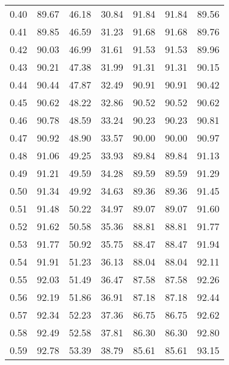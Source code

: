 \begin{tabular}{|c|c|c|c|c|c|c|}
      0.40 &     89.67 &     46.18 &      30.84 &   91.84 &      91.84 &         89.56 \\
      0.41 &     89.85 &     46.59 &      31.23 &   91.68 &      91.68 &         89.76 \\
      0.42 &     90.03 &     46.99 &      31.61 &   91.53 &      91.53 &         89.96 \\
      0.43 &     90.21 &     47.38 &      31.99 &   91.31 &      91.31 &         90.15 \\
      0.44 &     90.44 &     47.87 &      32.49 &   90.91 &      90.91 &         90.42 \\
      0.45 &     90.62 &     48.22 &      32.86 &   90.52 &      90.52 &         90.62 \\
      0.46 &     90.78 &     48.59 &      33.24 &   90.23 &      90.23 &         90.81 \\
      0.47 &     90.92 &     48.90 &      33.57 &   90.00 &      90.00 &         90.97 \\
      0.48 &     91.06 &     49.25 &      33.93 &   89.84 &      89.84 &         91.13 \\
      0.49 &     91.21 &     49.59 &      34.28 &   89.59 &      89.59 &         91.29 \\
      0.50 &     91.34 &     49.92 &      34.63 &   89.36 &      89.36 &         91.45 \\
      0.51 &     91.48 &     50.22 &      34.97 &   89.07 &      89.07 &         91.60 \\
      0.52 &     91.62 &     50.58 &      35.36 &   88.81 &      88.81 &         91.77 \\
      0.53 &     91.77 &     50.92 &      35.75 &   88.47 &      88.47 &         91.94 \\
      0.54 &     91.91 &     51.23 &      36.13 &   88.04 &      88.04 &         92.11 \\
      0.55 &     92.03 &     51.49 &      36.47 &   87.58 &      87.58 &         92.26 \\
      0.56 &     92.19 &     51.86 &      36.91 &   87.18 &      87.18 &         92.44 \\
      0.57 &     92.34 &     52.23 &      37.36 &   86.75 &      86.75 &         92.62 \\
      0.58 &     92.49 &     52.58 &      37.81 &   86.30 &      86.30 &         92.80 \\
      0.59 &     92.78 &     53.39 &      38.79 &   85.61 &      85.61 &         93.15 \\

\end{tabular}
